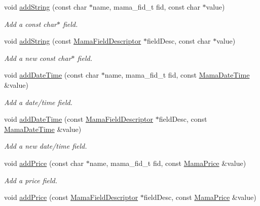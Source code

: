 \begin{DoxyCompactItemize}
void \hyperlink{classWombat_1_1MamaMsg_a14d258165d74d2045f546a7444cc5ae2}{addString} (const char $\ast$name, mama\_\-fid\_\-t fid, const char $\ast$value)
\begin{DoxyCompactList}\small\item\em Add a const char$\ast$ field. \item\end{DoxyCompactList}\item 
void \hyperlink{classWombat_1_1MamaMsg_a0cb3516efcfcdcd93a504ca5e83bbbca}{addString} (const \hyperlink{classWombat_1_1MamaFieldDescriptor}{MamaFieldDescriptor} $\ast$fieldDesc, const char $\ast$value)
\begin{DoxyCompactList}\small\item\em Add a new const char$\ast$ field. \item\end{DoxyCompactList}\item 
void \hyperlink{classWombat_1_1MamaMsg_adf38df8d45f7fa8889a75895abce1ebb}{addDateTime} (const char $\ast$name, mama\_\-fid\_\-t fid, const \hyperlink{classWombat_1_1MamaDateTime}{MamaDateTime} \&value)
\begin{DoxyCompactList}\small\item\em Add a date/time field. \item\end{DoxyCompactList}\item 
void \hyperlink{classWombat_1_1MamaMsg_a0597ee3c41019c631f2e7abe36e7f8e8}{addDateTime} (const \hyperlink{classWombat_1_1MamaFieldDescriptor}{MamaFieldDescriptor} $\ast$fieldDesc, const \hyperlink{classWombat_1_1MamaDateTime}{MamaDateTime} \&value)
\begin{DoxyCompactList}\small\item\em Add a new date/time field. \item\end{DoxyCompactList}\item 
void \hyperlink{classWombat_1_1MamaMsg_aa6dc9ba3aa320dd49b18e06158e97795}{addPrice} (const char $\ast$name, mama\_\-fid\_\-t fid, const \hyperlink{classWombat_1_1MamaPrice}{MamaPrice} \&value)
\begin{DoxyCompactList}\small\item\em Add a price field. \item\end{DoxyCompactList}\item 
void \hyperlink{classWombat_1_1MamaMsg_a49d52a4e265ba3479572c6d549058002}{addPrice} (const \hyperlink{classWombat_1_1MamaFieldDescriptor}{MamaFieldDescriptor} $\ast$fieldDesc, const \hyperlink{classWombat_1_1MamaPrice}{MamaPrice} \&value)

\end{DoxyCompactItemize}
